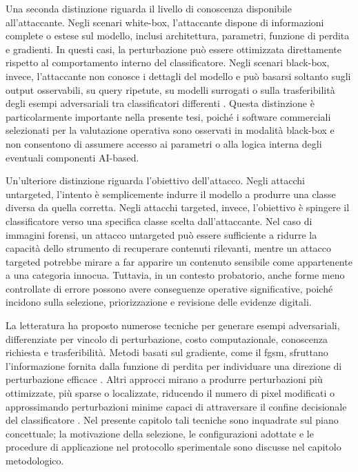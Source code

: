 Una seconda distinzione riguarda il livello di conoscenza disponibile all'attaccante. Negli scenari white-box, l'attaccante dispone di informazioni complete o estese sul modello, inclusi architettura, parametri, funzione di perdita e gradienti. In questi casi, la perturbazione può essere ottimizzata direttamente rispetto al comportamento interno del classificatore. Negli scenari black-box, invece, l'attaccante non conosce i dettagli del modello e può basarsi soltanto sugli output osservabili, su query ripetute, su modelli surrogati o sulla trasferibilità degli esempi adversariali tra classificatori differenti \cite{papernot2016limitations,carlini2017towards,yuan2019adversarial}. Questa distinzione è particolarmente importante nella presente tesi, poiché i software commerciali selezionati per la valutazione operativa sono osservati in modalità black-box e non consentono di assumere accesso ai parametri o alla logica interna degli eventuali componenti AI-based.

Un'ulteriore distinzione riguarda l'obiettivo dell'attacco. Negli attacchi untargeted, l'intento è semplicemente indurre il modello a produrre una classe diversa da quella corretta. Negli attacchi targeted, invece, l'obiettivo è spingere il classificatore verso una specifica classe scelta dall'attaccante. Nel caso di immagini forensi, un attacco untargeted può essere sufficiente a ridurre la capacità dello strumento di recuperare contenuti rilevanti, mentre un attacco targeted potrebbe mirare a far apparire un contenuto sensibile come appartenente a una categoria innocua. Tuttavia, in un contesto probatorio, anche forme meno controllate di errore possono avere conseguenze operative significative, poiché incidono sulla selezione, priorizzazione e revisione delle evidenze digitali.

La letteratura ha proposto numerose tecniche per generare esempi adversariali, differenziate per vincolo di perturbazione, costo computazionale, conoscenza richiesta e trasferibilità. Metodi basati sul gradiente, come il \gls{fgsm}, sfruttano l'informazione fornita dalla funzione di perdita per individuare una direzione di perturbazione efficace \cite{goodfellow2015explaining}. Altri approcci mirano a produrre perturbazioni più ottimizzate, più sparse o localizzate, riducendo il numero di pixel modificati o approssimando perturbazioni minime capaci di attraversare il confine decisionale del classificatore \cite{carlini2017towards,su2019onepixel,moosavi2016deepfool,zhang2024superdeepfool}. Nel presente capitolo tali tecniche sono inquadrate sul piano concettuale; la motivazione della selezione, le configurazioni adottate e le procedure di applicazione nel protocollo sperimentale sono discusse nel capitolo metodologico.

